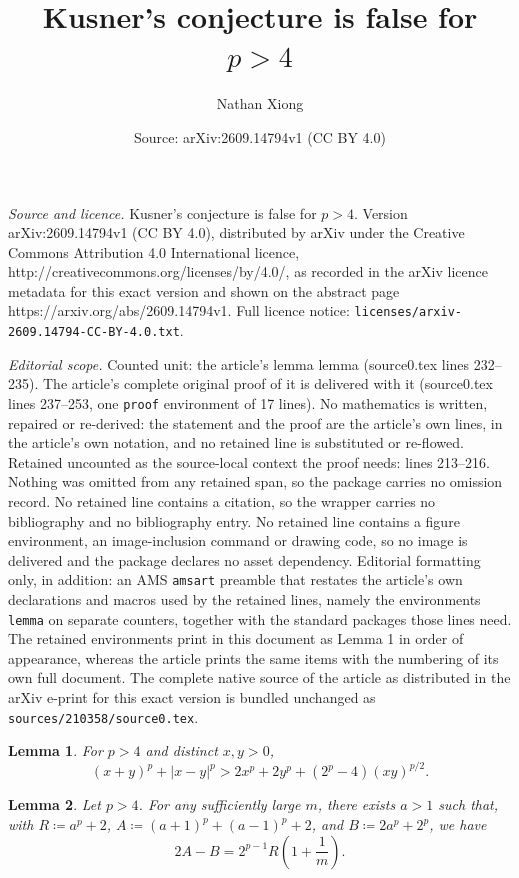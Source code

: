 \documentclass[10pt,a4paper]{amsart}
\title{Kusner's conjecture is false for $p>4$}
\author{Nathan Xiong}
\date{Source: arXiv:2609.14794v1 (CC BY 4.0)}
\newtheorem{lemma}{Lemma}
\begin{document}
\maketitle

\noindent\emph{Source and licence.} Kusner's conjecture is false for $p>4$. Version arXiv:2609.14794v1 (CC BY 4.0), distributed by arXiv under the Creative Commons Attribution 4.0 International licence, http://creativecommons.org/licenses/by/4.0/, as recorded in the arXiv licence metadata for this exact version and shown on the abstract page https://arxiv.org/abs/2609.14794v1. Full licence notice: \texttt{licenses/arxiv-2609.14794-CC-BY-4.0.txt}.\par\smallskip

\noindent\textit{Editorial scope.} Counted unit: the article's lemma lemma (source0.tex lines 232--235). The article's complete original proof of it is delivered with it (source0.tex lines 237--253, one \texttt{proof} environment of 17 lines). No mathematics is written, repaired or re-derived: the statement and the proof are the article's own lines, in the article's own notation, and no retained line is substituted or re-flowed.  Retained uncounted as the source-local context the proof needs: lines 213--216.  Nothing was omitted from any retained span, so the package carries no omission record.  No retained line contains a citation, so the wrapper carries no bibliography and no bibliography entry.  No retained line contains a figure environment, an image-inclusion command or drawing code, so no image is delivered and the package declares no asset dependency.  Editorial formatting only, in addition: an AMS \texttt{amsart} preamble that restates the article's own declarations and macros used by the retained lines, namely the environments \texttt{lemma} on separate counters, together with the standard packages those lines need.  The retained environments print in this document as Lemma 1 in order of appearance, whereas the article prints the same items with the numbering of its own full document.  The complete native source of the article as distributed in the arXiv e-print for this exact version is bundled unchanged as \texttt{sources/210358/source0.tex}.
\begin{lemma}\label{lem:power-ineq}
For $p>4$ and distinct $x,y>0$,
\[(x+y)^p+|x-y|^p>2x^p+2y^p+(2^p-4)(xy)^{p/2}.\]
\end{lemma}

\begin{lemma}
Let $p>4$. For any sufficiently large $m$, there exists $a>1$ such that, with $R\coloneqq a^p+2$, $A\coloneq (a+1)^p+(a-1)^p+2$, and $B\coloneq 2a^p+2^p$, we have
\[2A-B=2^{p-1}R\left(1+\frac{1}{m}\right).\]
\end{lemma}
\end{document}
